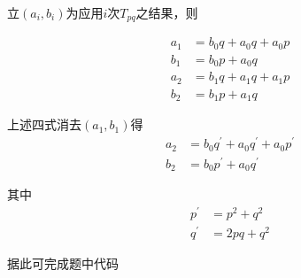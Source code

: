 \documentclass{ctexart}
\date{} %
\title{}
\author{}
\begin{document}
\maketitle

\noindent 立$(a_i,b_i)$为应用$i$次$T_{pq}$之结果，则

\begin{equation}
\begin{aligned}
a_1&=b_0q+a_0q+a_0p \\
b_1&=b_0p+a_0q \\
a_2&=b_1q+a_1q+a_1p \\
b_2&=b_1p+a_1q
\end{aligned}
\end{equation}

\noindent 上述四式消去$(a_1, b_1)$得
\begin{equation}
\begin{aligned}
a_2&=b_0q^{\prime}+a_0q^{\prime}+a_0p^{\prime} \\
b_2&=b_0p^{\prime}+a_0q^{\prime}
\end{aligned}
\end{equation}

\noindent 其中
\begin{equation}
\begin{aligned}
p^{\prime}&=p^2+q^2 \\
q^{\prime}&=2pq+q^2
\end{aligned}
\end{equation}

\noindent 据此可完成题中代码
\end{document}
